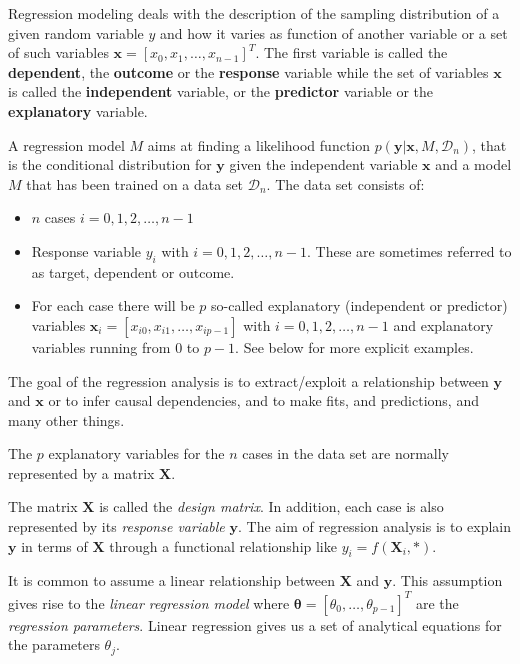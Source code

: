 \documentclass[%
oneside,                 %
final,                   %
10pt]{article}
\newenvironment{block_mdfboxadmon}[1][]{
\begin{block_mdfboxmdframed}[frametitle=#1]
}
{
\end{block_mdfboxmdframed}
}
\begin{document}
\begin{block_mdfboxadmon}[]

Regression modeling deals with the description of  the sampling distribution of a given random variable $y$ and how it varies as function of another variable or a set of such variables $\bm{x} =[x_0, x_1,\dots, x_{n-1}]^T$. 
The first variable is called the \textbf{dependent}, the \textbf{outcome} or the \textbf{response} variable while the set of variables $\bm{x}$ is called the \textbf{independent} variable, or the \textbf{predictor} variable or the \textbf{explanatory} variable. 

A regression model $M$ aims at finding a likelihood function $p(\bm{y}\vert \bm{x},M,\mathcal{D}_n)$, that is the conditional distribution for $\bm{y}$ given the independent variable $\bm{x}$ and a model $M$ that has been trained on a data set $\mathcal{D}_n$. The data set consists of: 
\begin{itemize}
\item $n$ cases $i = 0, 1, 2, \dots, n-1$ 

\item Response variable $y_i$ with $i = 0, 1, 2, \dots, n-1$. These are sometimes referred to as target, dependent or outcome.

\item For each case there will be $p$ so-called explanatory (independent or predictor) variables $\bm{x}_i=[x_{i0}, x_{i1}, \dots, x_{ip-1}]$ with $i = 0, 1, 2, \dots, n-1$ and explanatory variables running from $0$ to $p-1$. See below for more explicit examples. 
\end{itemize}

\noindent
 The goal of the regression analysis is to extract/exploit a relationship between $\bm{y}$ and $\bm{x}$ or to infer causal dependencies, and to make fits, and predictions, and many other things.
\end{block_mdfboxadmon} %




\begin{block_mdfboxadmon}[]
The $p$ explanatory variables for the $n$ cases in the data set are normally represented by a matrix $\mathbf{X}$.

The matrix $\mathbf{X}$ is called the \emph{design
matrix}. In addition, each case is also represented by its \emph{response variable} $\bm{y}$. The aim of
regression analysis is to explain $\bm{y}$ in terms of
$\bm{X}$ through a functional relationship like $y_i =
f(\mathbf{X}_{i},\ast )$.

It is common to assume a linear relationship
between $\bm{X}$ and $\bm{y}$. This assumption gives rise to
the \emph{linear regression model} where $\bm{\theta} = [\theta_0, \ldots,
\theta_{p-1}]^{T}$ are the \emph{regression parameters}. Linear regression gives us a set of analytical equations for the parameters $\theta_j$.
\end{block_mdfboxadmon} %
\end{document}
